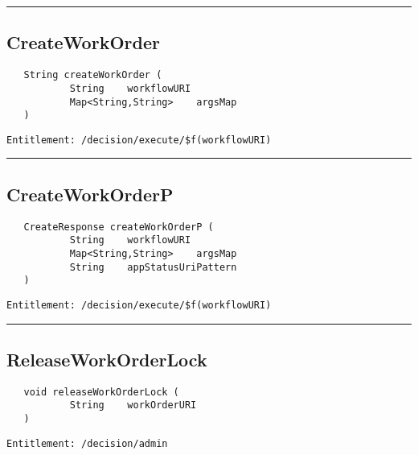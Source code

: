 \rule{12cm}{2pt}
\subsection{CreateWorkOrder}
\label{Api:CreateWorkOrder}
\begin{Verbatim}
   String createWorkOrder (
           String    workflowURI
           Map<String,String>    argsMap
   )
\end{Verbatim}
\begin{Verbatim}[formatcom=\color{Maroon}]
  Entitlement: /decision/execute/$f(workflowURI)
\end{Verbatim}



\rule{12cm}{2pt}
\subsection{CreateWorkOrderP}
\label{Api:CreateWorkOrderP}
\begin{Verbatim}
   CreateResponse createWorkOrderP (
           String    workflowURI
           Map<String,String>    argsMap
           String    appStatusUriPattern
   )
\end{Verbatim}
\begin{Verbatim}[formatcom=\color{Maroon}]
  Entitlement: /decision/execute/$f(workflowURI)
\end{Verbatim}



\rule{12cm}{2pt}
\subsection{ReleaseWorkOrderLock}
\label{Api:ReleaseWorkOrderLock}
\begin{Verbatim}
   void releaseWorkOrderLock (
           String    workOrderURI
   )
\end{Verbatim}
\begin{Verbatim}[formatcom=\color{Maroon}]
  Entitlement: /decision/admin
\end{Verbatim}



